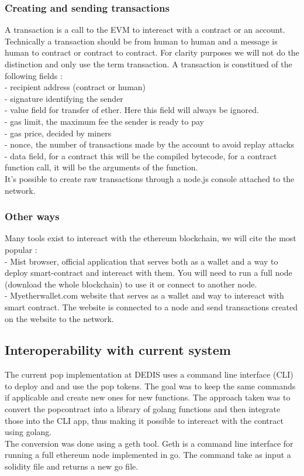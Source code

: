 \documentclass[11pt, a4paper, twoside, openright]{book} %
\begin{document}
\subsubsection{Creating and sending transactions}
A transaction is a call to the EVM to intereact with a contract or an account. Technically a transaction should be from human to human and a message is human to contract or contract to contract. For clarity purposes we will not do the distinction and only use the term transaction. A transaction is constitued of the following fields : \\
- recipient address (contract or human) \\
- signature identifying the sender \\
- value field for transfer of ether. Here this field will always be ignored.\\
- gas limit, the maximum fee the sender is ready to pay \\
- gas price, decided by miners \\
- nonce, the number of transactions made by the account to avoid replay attacks\\
- data field, for a contract this will be the compiled bytecode, for a contract function call, it will be the arguments of the function. \\

It's possible to create raw transactions through a node.js console attached to the network.


\subsubsection{Other ways}
Many tools exist to intereact with the ethereum blockchain, we will cite the most popular : \\
- Mist browser, official application that serves both as a wallet and a way to deploy smart-contract and intereact with them. You will need to run a full node (download the whole blockchain) to use it or connect to another node.\\
- Myetherwallet.com website that serves as a wallet and way to intereact with smart contract. The website is connected to a node and send transactions created on the website to the network.



\subsection{Interoperability with current system}
The current pop implementation at DEDIS uses a command line interface (CLI) to deploy and and use the pop tokens. The goal was to keep the same commands if applicable and create new ones for new functions. The approach taken was to convert the popcontract into a library of golang functions and then integrate those into the CLI app, thus making it possible to intereact with the contract using golang.\\
The conversion was done using a geth tool. Geth is a command line interface for running a full ethereum node implemented in go. The command take as input a solidity file and returns a new go file. 
\end{document}
